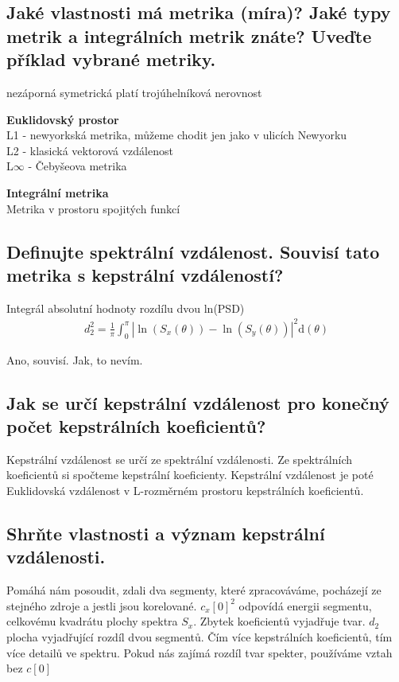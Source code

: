 \documentclass[a4paper,12pt]{article}   %
\newcommand{\mt}[1]{$#1$}
\newcommand{\dd}{\text{d}}
\begin{document}
\subsection{Jaké vlastnosti má metrika (míra)? Jaké typy metrik a integrálních metrik znáte? Uveďte příklad vybrané metriky.}
\begin{outline}
        \1 nezáporná
        \1 symetrická
        \1 platí trojúhelníková nerovnost
\end{outline}

\textbf{Euklidovský prostor}\\
L1 - newyorkská metrika, můžeme chodit jen jako v ulicích Newyorku\\
L2 - klasická vektorová vzdálenost\\
L\mt{\infty} - Čebyšeova metrika

\textbf{Integrální metrika}\\
Metrika v prostoru spojitých funkcí


\subsection{Definujte spektrální vzdálenost. Souvisí tato metrika s kepstrální vzdáleností?} 
Integrál absolutní hodnoty rozdílu dvou ln(PSD)
\begin{align*}
        d_2^2 = \frac{1}{\pi} \int _0^\pi |\ln(S_x(\theta)) - \ln(S_y(\theta))|^2\dd (\theta)
\end{align*}

Ano, souvisí. Jak, to nevím.


\subsection{Jak se určí kepstrální vzdálenost pro konečný počet kepstrálních koeficientů?}

Kepstrální vzdálenost se určí ze spektrální vzdálenosti. Ze spektrálních koeficientů si spočteme kepstrální koeficienty. Kepstrální vzdálenost je poté Euklidovská vzdálenost v L-rozměrném prostoru kepstrálních koeficientů.


\subsection{Shrňte vlastnosti a význam kepstrální vzdálenosti.}
\begin{outline}
        \1 Pomáhá nám posoudit, zdali dva segmenty, které zpracováváme, pocházejí ze stejného zdroje a jestli jsou korelované.
        \1 \mt{c_x[0]^2} odpovídá energii segmentu, celkovému kvadrátu plochy spektra \mt{S_x}. Zbytek koeficientů vyjadřuje tvar. 
        \1 \mt{d_2} plocha vyjadřující rozdíl dvou segmentů. 
        \1 Čím více kepstrálních koeficientů, tím více detailů ve spektru. 
        \1 Pokud nás zajímá rozdíl tvar spekter, používáme vztah bez \mt{c[0]}
\end{outline}
\end{document}
